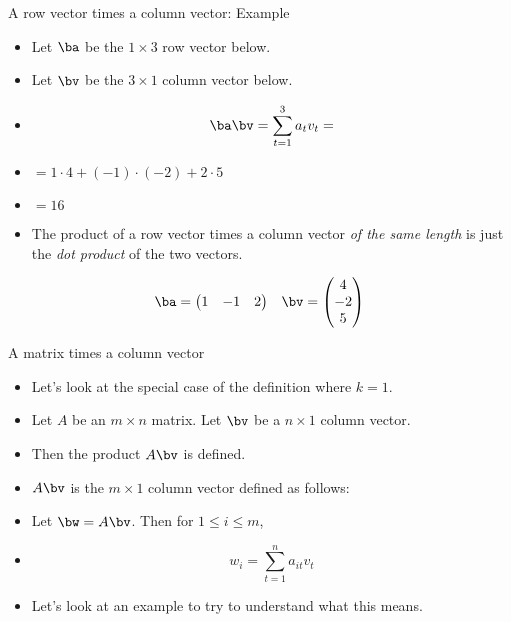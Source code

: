 \documentclass{beamer}
\begin{document}
\begin{frame}{A row vector times a column vector: Example}

\begin{itemize}
\item Let $\ba$ be the $1\times 3$ row vector below.
\item Let $\bv$ be the $3\times 1$ column vector below.
\item $$\ba \bv  = \sum_{t=1}^3 a_t  v_t = $$
\item $ = 1\cdot 4 + (-1)\cdot (-2) + 2\cdot 5$
\item $=16$
\item The product of a row vector times a column vector
\emph{of the same length} is just the \emph{dot product} of the two vectors.
\end{itemize}

$$
\begin{matrix}

\ba =

\begin{pmatrix}
1 & -1 & 2
\end{pmatrix}

&

\bv =

\begin{pmatrix}
4 \\ -2 \\ 5
\end{pmatrix}

\end{matrix}
$$

\end{frame}


\begin{frame}{A matrix times a column vector}

\begin{itemize}
\item Let's look at the special case of the  definition where $k=1$.
\item Let $A$ be an $m\times n$ matrix. Let $\bv$ be a $n\times 1$ column vector.
\item Then the product $A \bv$ is defined.
\item $A \bv$ is the $m\times 1$ column vector defined as follows:
\item Let $\bw=A \bv$. Then for $1\leq i \leq m$,
\item $$w_i = \sum_{t=1}^n a_{it} v_{t}$$
\item Let's look at an example to try to understand what this means.
\end{itemize}

\end{frame}
\end{document}
